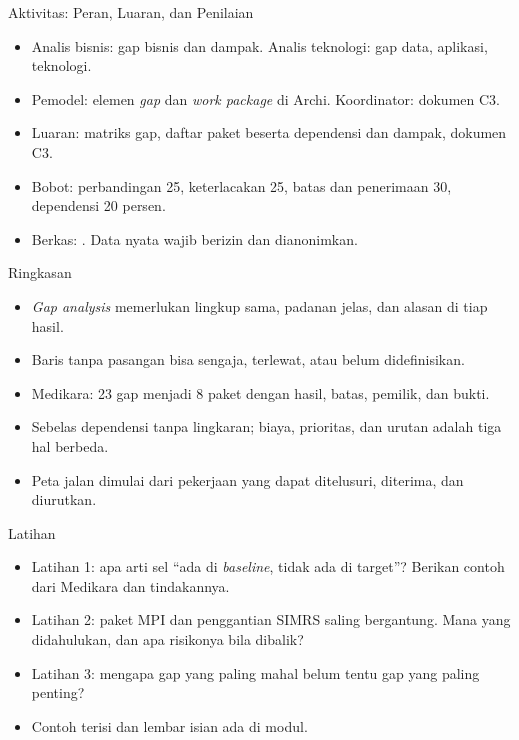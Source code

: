 \documentclass[aspectratio=169, table, 12pt]{beamer}
\begin{document}
\begin{frame}{{\Large Aktivitas: Peran, Luaran, dan Penilaian}}
  \vspace{10pt}
  \begin{itemize}
    \item Analis bisnis: gap bisnis dan dampak. Analis teknologi: gap data, aplikasi, teknologi.
    \item Pemodel: elemen \textit{gap} dan \textit{work package} di Archi. Koordinator: dokumen C3.
    \item Luaran: matriks gap, daftar paket beserta dependensi dan dampak, dokumen C3.
    \item Bobot: perbandingan 25, keterlacakan 25, batas dan penerimaan 30, dependensi 20 persen.
    \item Berkas: . Data nyata wajib berizin dan dianonimkan.
  \end{itemize}
\end{frame}

\begin{frame}{{\Large Ringkasan}}
  \vspace{10pt}
  \begin{itemize}
    \item \textit{Gap analysis} memerlukan lingkup sama, padanan jelas, dan alasan di tiap hasil.
    \item Baris tanpa pasangan bisa sengaja, terlewat, atau belum didefinisikan.
    \item Medikara: 23 gap menjadi 8 paket dengan hasil, batas, pemilik, dan bukti.
    \item Sebelas dependensi tanpa lingkaran; biaya, prioritas, dan urutan adalah tiga hal berbeda.
    \item Peta jalan dimulai dari pekerjaan yang dapat ditelusuri, diterima, dan diurutkan.
  \end{itemize}
\end{frame}

\begin{frame}{{\Large Latihan}}
  \vspace{10pt}
  \begin{itemize}
    \item Latihan 1: apa arti sel ``ada di \textit{baseline}, tidak ada di target''? Berikan contoh dari
          Medikara dan tindakannya.
    \item Latihan 2: paket MPI dan penggantian SIMRS saling bergantung. Mana yang didahulukan, dan apa
          risikonya bila dibalik?
    \item Latihan 3: mengapa gap yang paling mahal belum tentu gap yang paling penting?
    \item Contoh terisi dan lembar isian ada di modul.
  \end{itemize}
\end{frame}
\end{document}

